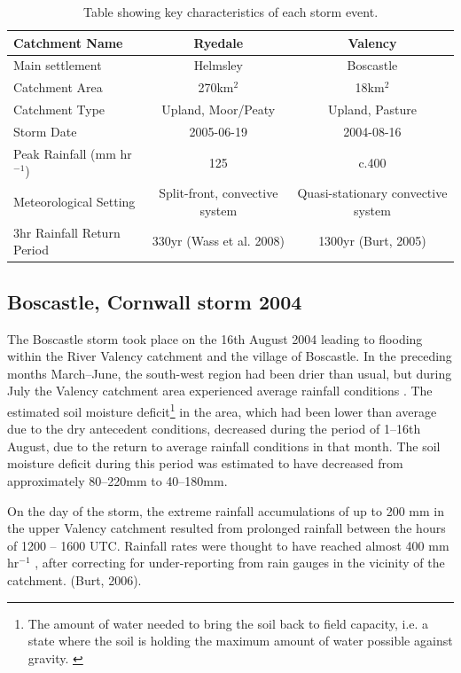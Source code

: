 \linespread{1.5}
\begin{table}
\resizebox{\textwidth}{!}
{%
\begin{tabular}{l c c} \hline

Catchment Name 			& \textbf{Ryedale} &  \textbf{Valency} \\ \hline
Main settlement        & Helmsley             & Boscastle \\
Catchment Area   			& 270km$^2$ 				& 18km$^2$ \\ 
Catchment Type         & Upland, Moor/Peaty & Upland, Pasture \\ 
Storm Date	 		            & 2005-06-19 	& 2004-08-16 \\ 
Peak Rainfall	 (mm hr \(^{-1}\))  & 125  & c.400 \\
Meteorological Setting	 	& Split-front, convective system & Quasi-stationary convective system \\ 
3hr Rainfall Return Period 	 & 330yr (Wass et al. 2008)	& 1300yr (Burt, 2005) \\ \hline
\end{tabular}
}
\caption{Table showing key characteristics of each storm event.}
\label{table_met_setting}
\end{table}

\subsection{Boscastle, Cornwall storm 2004}
The Boscastle storm took place on the 16th August 2004 leading to flooding within the River Valency catchment and the village of Boscastle. In the preceding months March--June, the south-west region had been drier than usual, but during July the Valency catchment area experienced average rainfall conditions \citep{golding2005boscastle}. The estimated soil moisture deficit\footnote{The amount of water needed to bring the soil back to field capacity, i.e. a state where the soil is holding the maximum amount of water possible against gravity. \citep{beven2011rainfall}} in the area, which had been lower than average due to the dry antecedent conditions, decreased during the period of 1--16th August, due to the return to average rainfall conditions in that month. The soil moisture deficit during this period was estimated to have decreased from approximately 80--220mm to 40--180mm.

On the day of the storm, the extreme rainfall accumulations of up to 200 mm in the upper Valency catchment resulted from prolonged rainfall between the hours of 1200 -- 1600 UTC. Rainfall rates were thought to have reached almost 400 mm hr\(^{-1}\) \citep{golding2005boscastle}, after correcting for under-reporting from rain gauges in the vicinity of the catchment. (Burt, 2006).

